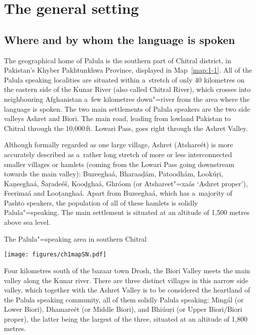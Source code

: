 \section{The general setting}
\label{sec:1-2}
\subsection{Where and by whom the language is spoken}
\label{subsec:1-2-1}

The geographical home of Palula is the southern part of Chitral district, in Pakistan's Khyber Pakhtunkhwa Province, displayed in Map~\ref{map:1-1}. All of the Palula speaking localities are
situated within a~stretch of only 40 kilometres on the eastern side of the Kunar River (also called
Chitral River), which crosses into neighbouring Afghanistan a~few kilometres down"=river from the
area where the language is spoken. The two main settlements of Palula speakers are the two side valleys Ashret and Biori. The main road, leading from lowland Pakistan to Chitral through the 10,000\,ft. Lowari Pass, goes right through the Ashret Valley. 


Although formally regarded as one large village, Ashret (Atshareét) is more accurately described as a~rather long stretch of more or less interconnected smaller villages or hamlets (coming from the Lowari Pass going downstream towards the main valley): Buzeeghaá, Bharaaḍám, Patoodhám, Lookúṛi, Kaṇeeghaá, Šaṛadeéš, Kooḍghaá, Ghróom (or Atshareet"=xaás `Ashret proper'), Feerimaá and Looṭanghaá. Apart from Buzeeghaá, which has a~majority of Pashto speakers, the population of all of these hamlets is solidly Palula"=speaking. The main settlement is situated at an altitude of 1,500 metres above sea level.

\begin{mapfigure}[p!]
\caption{The Palula"=speaking area in southern Chitral}
\texttt{[image: figures/ch1mapSN.pdf]}
\label{map:1-1}
\end{mapfigure}


Four kilometres south of the bazaar town Drosh, the Biori Valley meets the main valley along the Kunar river. There are three distinct villages in this narrow side valley, which together with the Ashret Valley is to be considered the heartland of the Palula speaking community, all of them solidly Palula speaking: Mingál (or Lower Biori), Dhamareét (or Middle Biori), and Bhiúuṛi (or Upper Biori/Biori proper), the latter being the largest of the three, situated at an altitude of 1,800 metres. 


